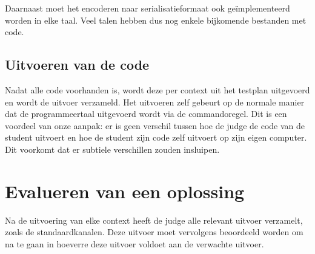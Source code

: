 Daarnaast moet het encoderen naar serialisatieformaat ook geïmplementeerd worden in elke taal.
Veel talen hebben dus nog enkele bijkomende bestanden met code.

\subsection{Uitvoeren van de code}\label{subsec:uitvoeren-van-de-code}

Nadat alle code voorhanden is, wordt deze per context uit het testplan uitgevoerd en wordt de uitvoer verzameld.
Het uitvoeren zelf gebeurt op de normale manier dat de programmeertaal uitgevoerd wordt via de commandoregel.
Dit is een voordeel van onze aanpak: er is geen verschil tussen hoe de judge de code van de student uitvoert en hoe de student zijn code zelf uitvoert op zijn eigen computer.
Dit voorkomt dat er subtiele verschillen zouden insluipen.

\section{Evalueren van een oplossing}\label{sec:evalueren-van-een-oplossing2}

Na de uitvoering van elke context heeft de judge alle relevant uitvoer verzamelt, zoals de standaardkanalen.
Deze uitvoer moet vervolgens beoordeeld worden om na te gaan in hoeverre deze uitvoer voldoet aan de verwachte uitvoer.
